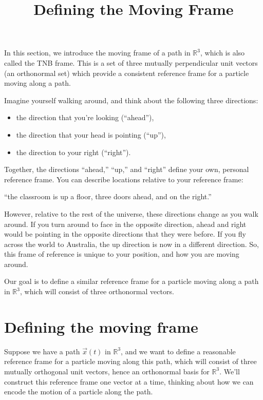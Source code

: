 \documentclass{ximera}
\title{Defining the Moving Frame}
\begin{document}
\begin{abstract}
\end{abstract}
\maketitle

In this section, we introduce the moving frame of a path in $\mathbb{R}^3$, which is also called the TNB frame. This is a set of three mutually perpendicular unit vectors (an orthonormal set) which provide a consistent reference frame for a particle moving along a path.

Imagine yourself walking around, and think about the following three directions:
\begin{itemize}
\item the direction that you're looking (``ahead''),
\item the direction that your head is pointing (``up''),
\item the direction to your right (``right'').
\end{itemize}
Together, the directions ``ahead,'' ``up,'' and ``right'' define your own, personal reference frame. You can describe locations relative to your reference frame:
\begin{center}
``the classroom is up a floor, three doors ahead, and on the right.'' 
\end{center}
However, relative to the rest of the universe, these directions change as you walk around. If you turn around to face in the opposite direction, ahead and right would be pointing in the opposite directions that they were before. If you fly across the world to Australia, the up direction is now in a different direction. So, this frame of reference is unique to your position, and how you are moving around.

Our goal is to define a similar reference frame for a particle moving along a path in $\mathbb{R}^3$, which will consist of three orthonormal vectors. 

\section*{Defining the moving frame}

Suppose we have a path $\vec{x}(t)$ in $\mathbb{R}^3$, and we want to define a reasonable reference frame for a particle moving along this path, which will consist of three mutually orthogonal unit vectors, hence an orthonormal basis for $\mathbb{R}^3$. We'll construct this reference frame one vector at a time, thinking about how we can encode the motion of a particle along the path.
\end{document}
